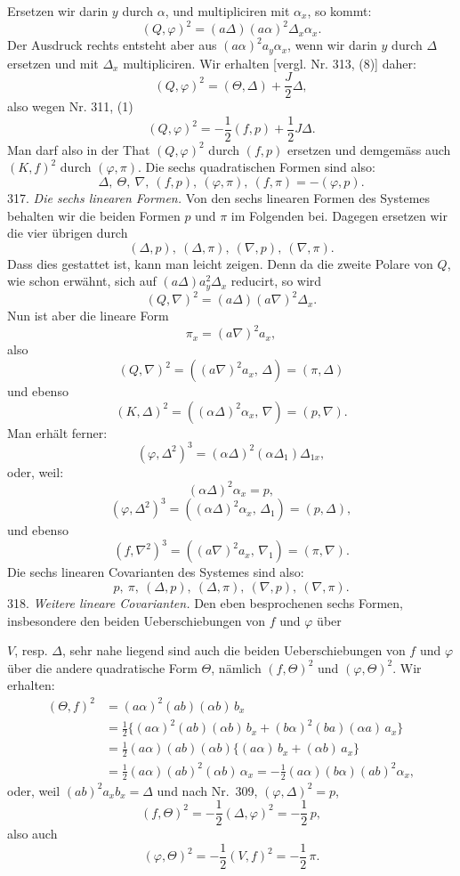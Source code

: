 \documentclass[11pt]{article}
\providecommand{\weberpage}[1]{}
\providecommand{\weq}[2]{\begin{equation}\tag{#1}#2\end{equation}}
\let\Delta\varDelta
\let\Theta\varTheta
\begin{document}
\weberpage{340}
Ersetzen wir darin $y$ durch $\alpha$, und multipliciren mit $\alpha_x$, so kommt:
\[
(Q,\varphi)^2 = (a\Delta)(a\alpha)^2\Delta_x\alpha_x.
\]
Der Ausdruck rechts entsteht aber aus $(a\alpha)^2a_y\alpha_x$, wenn wir darin $y$ durch $\Delta$ ersetzen und mit $\Delta_x$ multipliciren. Wir erhalten [vergl. Nr. 313, (8)] daher:
\[
(Q,\varphi)^2 = (\Theta,\Delta) + \frac{J}{2}\Delta,
\]
also wegen Nr. 311, (1)
\weq{1}{(Q,\varphi)^2 = -\frac{1}{2}(f,p) + \frac{1}{2}J\Delta.}
Man darf also in der That $(Q,\varphi)^2$ durch $(f,p)$ ersetzen und demgemäss auch $(K,f)^2$ durch $(\varphi,\pi)$. Die sechs quadratischen Formen sind also:
\[
\Delta,\ \Theta,\ \nabla,\ (f,p),\ (\varphi,\pi),\ (f,\pi) = -(\varphi,p).
\]
317. \textit{Die sechs linearen Formen.} Von den sechs linearen Formen des Systemes behalten wir die beiden Formen $p$ und $\pi$ im Folgenden bei. Dagegen ersetzen wir die vier übrigen durch
\[
(\Delta,p),\ (\Delta,\pi),\ (\nabla,p),\ (\nabla,\pi).
\]
Dass dies gestattet ist, kann man leicht zeigen. Denn da die zweite Polare von $Q$, wie schon erwähnt, sich auf $(a\Delta)a_y^2\Delta_x$ reducirt, so wird
\[
(Q,\nabla)^2 = (a\Delta)(a\nabla)^2\Delta_x.
\]
Nun ist aber die lineare Form
\[
\pi_x = (a\nabla)^2a_x,
\]
also
\weq{1}{(Q,\nabla)^2 = \left((a\nabla)^2a_x,\, \Delta\right) = (\pi,\Delta)}
und ebenso
\weq{2}{(K,\Delta)^2 = \left((\alpha\Delta)^2\alpha_x,\, \nabla\right) = (p,\nabla).}
Man erhält ferner:
\[
(\varphi,\Delta^2)^3 = (\alpha\Delta)^2(\alpha\Delta_1)\Delta_{1x},
\]
oder, weil:
\[
(\alpha\Delta)^2\alpha_x = p,
\]
\weq{3}{(\varphi,\Delta^2)^3 = \left((\alpha\Delta)^2\alpha_x,\, \Delta_1\right) = (p,\Delta),}
und ebenso
\weq{4}{(f,\nabla^2)^3 = \left((a\nabla)^2a_x,\, \nabla_1\right) = (\pi,\nabla).}
Die sechs linearen Covarianten des Systemes sind also:
\[
p,\ \pi,\ (\Delta,p),\ (\Delta,\pi),\ (\nabla,p),\ (\nabla,\pi).
\]
318. \textit{Weitere lineare Covarianten.} Den eben besprochenen sechs Formen, insbesondere den beiden Ueberschiebungen von $f$ und $\varphi$ über


\weberpage{341}
$V$, resp. $\Delta$, sehr nahe liegend sind auch die beiden Ueberschiebungen
von $f$ und $\varphi$ über die andere quadratische Form $\Theta$, nämlich
$(f, \Theta)^2$ und $(\varphi, \Theta)^2$. Wir erhalten:
\[
\begin{aligned}
(\Theta, f)^2 &= (a\alpha)^2(ab)(\alpha b)\,b_x\\
&= \frac{1}{2}\{(a\alpha)^2(ab)(\alpha b)\,b_x + (b\alpha)^2(ba)(\alpha a)\,a_x\}\\
&= \frac{1}{2}(a\alpha)(ab)(\alpha b)\{(a\alpha)\,b_x + (\alpha b)\,a_x\}\\
&= \frac{1}{2}(a\alpha)(ab)^2(\alpha b)\,\alpha_x = -\frac{1}{2}(a\alpha)(b\alpha)(ab)^2\alpha_x,
\end{aligned}
\]
oder, weil $(ab)^2a_xb_x = \Delta$ und nach Nr.\ 309, $(\varphi, \Delta)^2 = p$,
\weq{1}{(f, \Theta)^2 = -\frac{1}{2}(\Delta, \varphi)^2 = -\frac{1}{2}\,p,}
also auch
\weq{2}{(\varphi, \Theta)^2 = -\frac{1}{2}(V, f)^2 = -\frac{1}{2}\,\pi.}
\end{document}
